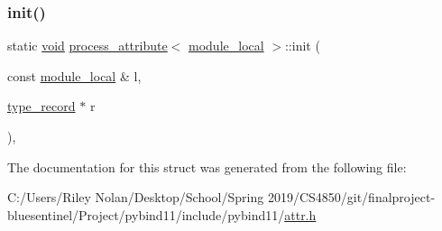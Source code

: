 \subsubsection{\texorpdfstring{init()}{init()}}
{\footnotesize\ttfamily static \mbox{\hyperlink{_s_d_l__opengles2__gl2ext_8h_ae5d8fa23ad07c48bb609509eae494c95}{void}} \mbox{\hyperlink{structprocess__attribute}{process\+\_\+attribute}}$<$ \mbox{\hyperlink{structmodule__local}{module\+\_\+local}} $>$\+::init (\begin{DoxyParamCaption}\item[{const \mbox{\hyperlink{structmodule__local}{module\+\_\+local}} \&}]{l,  }\item[{\mbox{\hyperlink{structtype__record}{type\+\_\+record}} $\ast$}]{r }\end{DoxyParamCaption})\hspace{0.3cm}{\ttfamily [inline]}, {\ttfamily [static]}}



The documentation for this struct was generated from the following file\+:\begin{DoxyCompactItemize}
\item 
C\+:/\+Users/\+Riley Nolan/\+Desktop/\+School/\+Spring 2019/\+C\+S4850/git/finalproject-\/bluesentinel/\+Project/pybind11/include/pybind11/\mbox{\hyperlink{attr_8h}{attr.\+h}}\end{DoxyCompactItemize}
